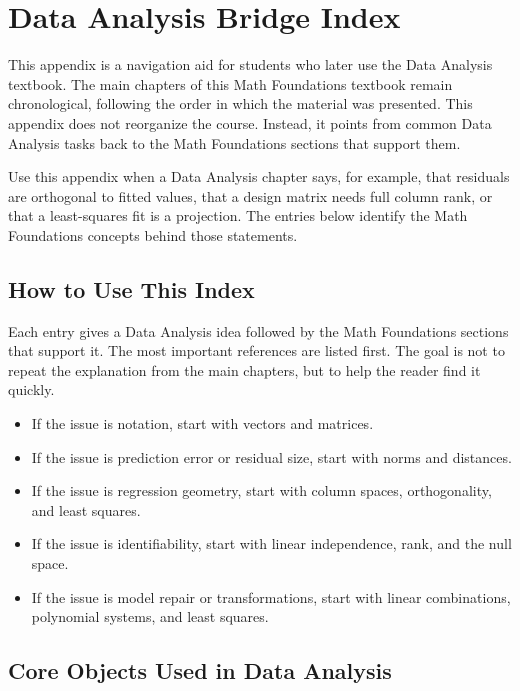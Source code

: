 \chapter{Data Analysis Bridge Index}
\label{mf:data-analysis-bridge-index}

\begingroup
\sloppy

This appendix is a navigation aid for students who later use the Data Analysis textbook. The main chapters of this Math Foundations textbook remain chronological, following the order in which the material was presented. This appendix does not reorganize the course. Instead, it points from common Data Analysis tasks back to the Math Foundations sections that support them.

Use this appendix when a Data Analysis chapter says, for example, that residuals are orthogonal to fitted values, that a design matrix needs full column rank, or that a least-squares fit is a projection. The entries below identify the Math Foundations concepts behind those statements.

\section{How to Use This Index}
\label{mf:da-bridge-how-to-use}

Each entry gives a Data Analysis idea followed by the Math Foundations sections that support it. The most important references are listed first. The goal is not to repeat the explanation from the main chapters, but to help the reader find it quickly.

\begin{itemize}
    \item If the issue is notation, start with vectors and matrices.
    \item If the issue is prediction error or residual size, start with norms and distances.
    \item If the issue is regression geometry, start with column spaces, orthogonality, and least squares.
    \item If the issue is identifiability, start with linear independence, rank, and the null space.
    \item If the issue is model repair or transformations, start with linear combinations, polynomial systems, and least squares.
\end{itemize}

\section{Core Objects Used in Data Analysis}
\label{mf:da-bridge-core-objects}

